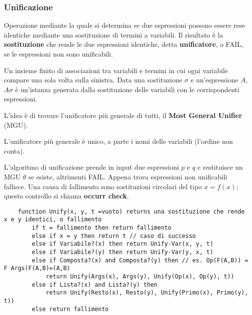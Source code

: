 \subsubsection{Unificazione}
\begin{definition}[Unificazione]
	Operazione mediante la quale si determina se due espressioni possono essere rese identiche mediante una sostituzione di termini a variabili. Il risultato è la \textbf{sostituzione} che rende le due espressioni identiche, detta \textbf{unificatore}, o FAIL, se le espressioni non sono unificabili.
\end{definition}
\begin{definition}[Sostituzione]
	Un insieme finito di associazioni tra variabili e termini in cui ogni variabile compare una sola volta sulla sinistra. Data una sostituzione $\sigma$ e un'espressione $A$, $A\sigma$ è un'istanza generata dalla sostituzione delle variabili con le corrispondenti espressioni.
\end{definition}
L'idea è di trovare l'unificatore più generale di tutti, il \textbf{Most General Unifier} (MGU).
\begin{theorem}
	L'unificatore più generale è unico, a parte i nomi delle variabili (l'ordine non conta).
\end{theorem}
L'algoritmo di unificazione prende in input due espressioni $p$ e $q$ e restituisce un MGU $\theta$ se esiste, altrimenti FAIL. Appena trova espressioni non unificabili fallisce. Una causa di fallimento sono sostituzioni circolari del tipo $x=f(x)$; questo controllo si chiama \textbf{occurr check}.

\begin{lstlisting}
	function Unify(x, y, t =vuoto) returns una sostituzione che rende x e y identici, o fallimento
		if t = fallimento then return fallimento
		else if x = y then return t // caso di successo
		else if Variabile?(x) then return Unify-Var(x, y, t)
		else if Variabile?(y) then return Unify-Var(y, x, t)
		else if Composta?(x) and Composta?(y) then // es. Op(F(A,B)) = F Args(F(A,B)=(A,B)
			return Unify(Args(x), Args(y), Unify(Op(x), Op(y), t))
		else if Lista?(x) and Lista?(y) then
			return Unify(Resto(x), Resto(y), Unify(Primo(x), Primo(y), t))
		else return fallimento
\end{lstlisting}

